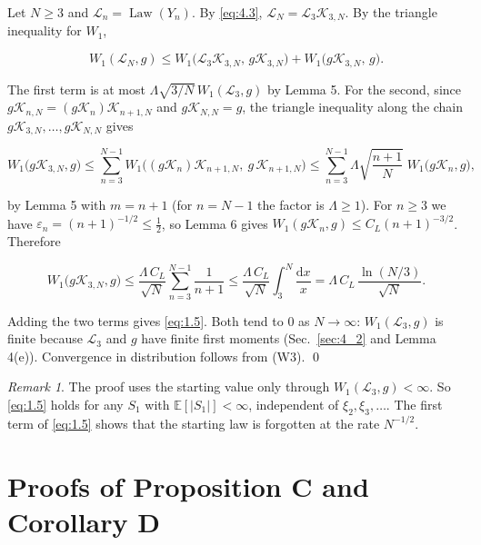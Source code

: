 \documentclass[aip,jmp,preprint,onecolumn,floatfix,superscriptaddress,nofootinbib,11pt]{revtex4-2}
\theoremstyle{plain}
\theoremstyle{remark}
\newtheorem*{remark}{Remark}
\numberwithin{equation}{section}
\newcommand{\dd}{\mathrm{d}}
\newcommand{\E}{\mathbb{E}}
\newcommand{\eps}{\varepsilon}
\newcommand{\Law}{\operatorname{Law}}
\begin{document}
Let $N\ge3$ and $\mathcal L_n=\Law(Y_n)$. By \eqref{eq:4.3}, $\mathcal L_N=\mathcal L_3\mathcal K_{3,N}$. By the triangle inequality for $W_1$,

\begin{equation*}
W_1(\mathcal L_N,g)\le W_1\big(\mathcal L_3\mathcal K_{3,N},\,g\mathcal K_{3,N}\big)+W_1\big(g\mathcal K_{3,N},\,g\big).
\end{equation*}

The first term is at most $\Lambda\sqrt{3/N}\,W_1(\mathcal L_3,g)$ by Lemma 5. For the second, since $g\mathcal K_{n,N}=(g\mathcal K_n)\mathcal K_{n+1,N}$ and $g\mathcal K_{N,N}=g$, the triangle inequality along the chain $g\mathcal K_{3,N},\dots,g\mathcal K_{N,N}$ gives

\begin{equation*}
W_1\big(g\mathcal K_{3,N},g\big)\le\sum_{n=3}^{N-1}W_1\big((g\mathcal K_n)\mathcal K_{n+1,N},\ g\,\mathcal K_{n+1,N}\big)\le\sum_{n=3}^{N-1}\Lambda\sqrt{\frac{n+1}{N}}\;W_1\big(g\mathcal K_n,g\big),
\end{equation*}

by Lemma 5 with $m=n+1$ (for $n=N-1$ the factor is $\Lambda\ge1$). For $n\ge3$ we have $\eps_n=(n+1)^{-1/2}\le\tfrac12$, so Lemma 6 gives $W_1(g\mathcal K_n,g)\le C_L(n+1)^{-3/2}$. Therefore

\begin{equation*}
W_1\big(g\mathcal K_{3,N},g\big)\le\frac{\Lambda\,C_L}{\sqrt N}\sum_{n=3}^{N-1}\frac{1}{n+1}\le\frac{\Lambda\,C_L}{\sqrt N}\int_3^N\frac{\dd x}{x}=\Lambda\,C_L\,\frac{\ln(N/3)}{\sqrt N}.
\end{equation*}

Adding the two terms gives \eqref{eq:1.5}. Both tend to $0$ as $N\to\infty$: $W_1(\mathcal L_3,g)$ is finite because $\mathcal L_3$ and $g$ have finite first moments (Sec.~\ref{sec:4_2} and Lemma 4(e)). Convergence in distribution follows from (W3). \qed

\begin{remark}
The proof uses the starting value only through $W_1(\mathcal L_3,g)<\infty$. So \eqref{eq:1.5} holds for any $S_1$ with $\E[|S_1|]<\infty$, independent of $\xi_2,\xi_3,\dots$. The first term of \eqref{eq:1.5} shows that the starting law is forgotten at the rate $N^{-1/2}$.
\end{remark}

\section{Proofs of Proposition C and Corollary D}\label{sec:5}
\end{document}
